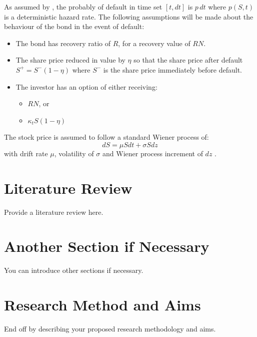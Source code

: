 \documentclass[a4paper,11pt,oneside]{article}
\newcommand{\setlinespacing}[1]
           {\renewcommand{\baselinestretch}{#1}\small\normalsize}
\def\convK{\ensuremath{\kappa_t}\xspace}
\def\defN{\ensuremath{R}\xspace}
\def\defS{\ensuremath{\eta}\xspace}
\begin{document}
As assumed by \cite{AFV03}, the probably of default in time set $[t, dt]$ is $p\,dt$ where $p(S, t)$ is a deterministic hazard rate.  The following assumptions will be made about the behaviour of the bond in the event of default:
\begin{itemize}
 \item The bond has recovery ratio of \defN, for a recovery value of $\defN N$.
 \item The share price reduced in value by \defS so that the share price after default $S^+ = S^- (1 - \defS)$ where $S^-$ is the share price immediately before default.
 \item The investor has an option of either receiving:
 \begin{itemize}
  \item $\defN N$, or
  \item $\convK S (1 - \defS)$
 \end{itemize}
\end{itemize}

The stock price is assumed to follow a standard Wiener process of:
\begin{displaymath}
dS = \mu S dt + \sigma S dz
\end{displaymath}
with drift rate $\mu$, volatility of $\sigma$ and Wiener process increment of $dz$ \cite{AFV03}.

\section{Literature Review}

Provide a literature review here.

\section{Another Section if Necessary}

You can introduce other sections if necessary.

\section{Research Method and Aims}

End off by describing your proposed research methodology and aims.


\clearpage
\setlinespacing{1}


\end{document}

